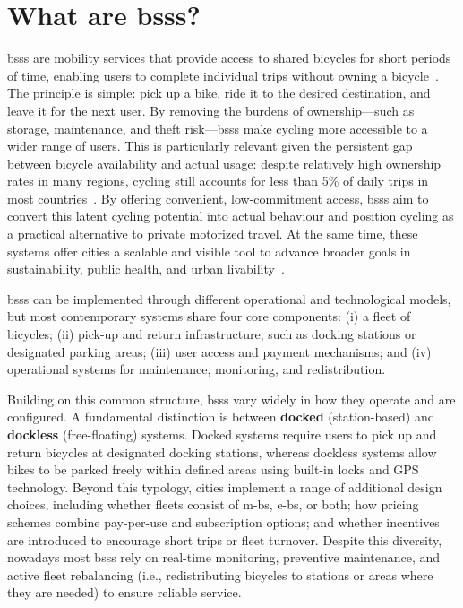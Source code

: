 \section[What are BSSs?]{What are \acp{bss}?}
\label{sec:what_are_bss}

\acp{bss} are mobility services that provide access to shared bicycles for short periods of time, enabling users to complete individual trips without owning a bicycle~\cite{Fishman2016}. The principle is simple: pick up a bike, ride it to the desired destination, and leave it for the next user. By removing the burdens of ownership—such as storage, maintenance, and theft risk—\acp{bss} make cycling more accessible to a wider range of users. This is particularly relevant given the persistent gap between bicycle availability and actual usage: despite relatively high ownership rates in many regions, cycling still accounts for less than 5\% of daily trips in most countries~\cite{Chen2022}. By offering convenient, low-commitment access, \acp{bss} aim to convert this latent cycling potential into actual behaviour and position cycling as a practical alternative to private motorized travel. At the same time, these systems offer cities a scalable and visible tool to advance broader goals in sustainability, public health, and urban livability~\cite{Shaheen2010, Ricci2015}.

\acp{bss} can be implemented through different operational and technological models, but most contemporary systems share four core components: (i) a fleet of bicycles; (ii) pick-up and return infrastructure, such as docking stations or designated parking areas; (iii) user access and payment mechanisms; and (iv) operational systems for maintenance, monitoring, and redistribution.

Building on this common structure, \acp{bss} vary widely in how they operate and are configured. A fundamental distinction is between \textbf{docked} (station-based) and \textbf{dockless} (free-floating) systems. Docked systems require users to pick up and return bicycles at designated docking stations, whereas dockless systems allow bikes to be parked freely within defined areas using built-in locks and GPS technology. Beyond this typology, cities implement a range of additional design choices, including whether fleets consist of \acp{m-b}, \acp{e-b}, or both; how pricing schemes combine pay-per-use and subscription options; and whether incentives are introduced to encourage short trips or fleet turnover. Despite this diversity, nowadays most \acp{bss} rely on real-time monitoring, preventive maintenance, and active fleet rebalancing (i.e., redistributing bicycles to stations or areas where they are needed) to ensure reliable service.

